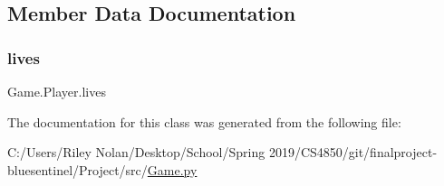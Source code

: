 \subsection{Member Data Documentation}
\mbox{\label{class_game_1_1_player_a09c47b9c7ba0a524773fa83e9afe747c}} 
\subsubsection{\texorpdfstring{lives}{lives}}
{\footnotesize\ttfamily Game.\+Player.\+lives}



The documentation for this class was generated from the following file\+:\begin{DoxyCompactItemize}
\item 
C\+:/\+Users/\+Riley Nolan/\+Desktop/\+School/\+Spring 2019/\+C\+S4850/git/finalproject-\/bluesentinel/\+Project/src/\mbox{\hyperlink{_game_8py}{Game.\+py}}\end{DoxyCompactItemize}
